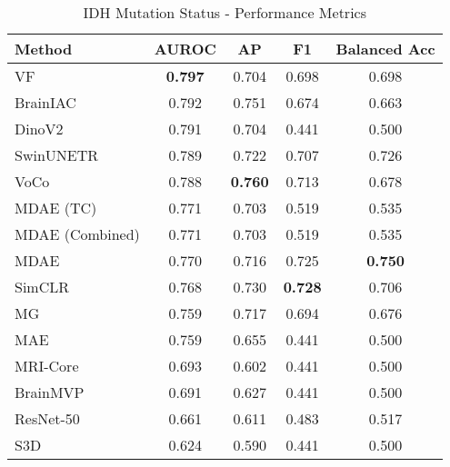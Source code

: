 \begin{table}[ht]
\centering
\caption{IDH Mutation Status - Performance Metrics}
\label{tab:ucsf_pdgm_idh_classification}
\begin{tabular}{lcccc}
\toprule
Method & AUROC & AP & F1 & Balanced Acc \\
\midrule
VF & \textbf{0.797} & 0.704 & 0.698 & 0.698 \\
BrainIAC & 0.792 & 0.751 & 0.674 & 0.663 \\
DinoV2 & 0.791 & 0.704 & 0.441 & 0.500 \\
SwinUNETR & 0.789 & 0.722 & 0.707 & 0.726 \\
VoCo & 0.788 & \textbf{0.760} & 0.713 & 0.678 \\
MDAE (TC) & 0.771 & 0.703 & 0.519 & 0.535 \\
MDAE (Combined) & 0.771 & 0.703 & 0.519 & 0.535 \\
MDAE & 0.770 & 0.716 & 0.725 & \textbf{0.750} \\
SimCLR & 0.768 & 0.730 & \textbf{0.728} & 0.706 \\
MG & 0.759 & 0.717 & 0.694 & 0.676 \\
MAE & 0.759 & 0.655 & 0.441 & 0.500 \\
MRI-Core & 0.693 & 0.602 & 0.441 & 0.500 \\
BrainMVP & 0.691 & 0.627 & 0.441 & 0.500 \\
ResNet-50 & 0.661 & 0.611 & 0.483 & 0.517 \\
S3D & 0.624 & 0.590 & 0.441 & 0.500 \\
\bottomrule
\end{tabular}
\end{table}
